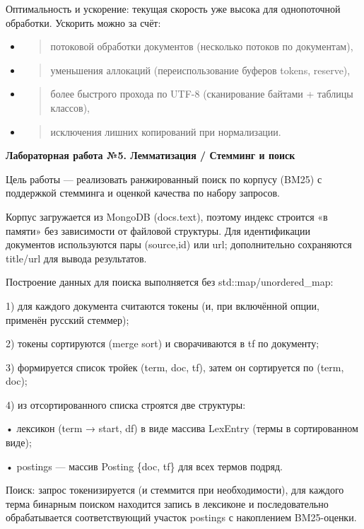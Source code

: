 \documentclass[12pt,a4paper]{article}
\begin{document}
Оптимальность и ускорение: текущая скорость уже высока для однопоточной
обработки. Ускорить можно за счёт:

\begin{itemize}
\item
  \begin{quote}
  потоковой обработки документов (несколько потоков по документам),
  \end{quote}
\item
  \begin{quote}
  уменьшения аллокаций (переиспользование буферов tokens, reserve),
  \end{quote}
\item
  \begin{quote}
  более быстрого прохода по UTF-8 (сканирование байтами + таблицы
  классов),
  \end{quote}
\item
  \begin{quote}
  исключения лишних копирований при нормализации.
  \end{quote}
\end{itemize}

\textbf{Лабораторная работа №5. Лемматизация / Стемминг и поиск}

Цель работы --- реализовать ранжированный поиск по корпусу (BM25) с
поддержкой стемминга и оценкой качества по набору запросов.

Корпус загружается из MongoDB (docs.text), поэтому индекс строится «в
памяти» без зависимости от файловой структуры. Для идентификации
документов используются пары (source,id) или url; дополнительно
сохраняются title/url для вывода результатов.

Построение данных для поиска выполняется без std::map/unordered\_map:

1) для каждого документа считаются токены (и, при включённой опции,
применён русский стеммер);

2) токены сортируются (merge sort) и сворачиваются в tf по документу;

3) формируется список тройек (term, doc, tf), затем он сортируется по
(term, doc);

4) из отсортированного списка строятся две структуры:

• лексикон (term → start, df) в виде массива LexEntry (термы в
сортированном виде);

• postings --- массив Posting \{doc, tf\} для всех термов подряд.

Поиск: запрос токенизируется (и стеммится при необходимости), для
каждого терма бинарным поиском находится запись в лексиконе и
последовательно обрабатывается соответствующий участок postings с
накоплением BM25-оценки.
\end{document}
